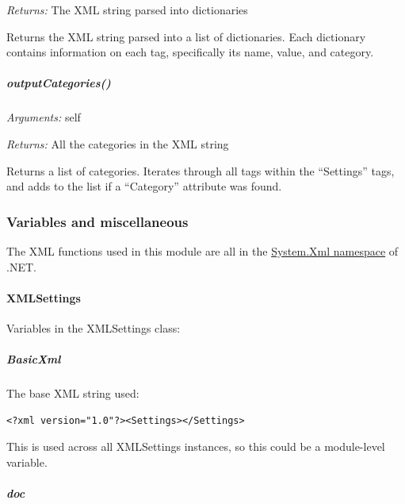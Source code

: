 \documentclass[12pt,letterpaper]{article}
\begin{document}
\emph{Returns:} The XML string parsed into dictionaries

Returns the XML string parsed into a list of dictionaries. Each dictionary contains information on each tag, specifically its name, value, and category.



%
%
\subparagraph{outputCategories()}
\label{4.4.1.0.7}

\emph{Arguments:} self

\emph{Returns:} All the categories in the XML string

Returns a list of categories. Iterates through all tags within the ``Settings'' tags, and adds to the list if a ``Category'' attribute was found.



%
%
\subsubsection{Variables and miscellaneous}
\label{4.4.2}

The XML functions used in this module are all in the \href{http://msdn.microsoft.com/en-us/library/y3y47afh.aspx}{System.Xml namespace} of .NET.

\setcounter{paragraph}{-1}



%
%
\paragraph{XMLSettings}
\label{4.4.2.0}

Variables in the XMLSettings class:

\setcounter{subparagraph}{-1}



%
%
\subparagraph{BasicXml}
\label{4.4.2.0.0}

The base XML string used:

\selectfont

\begin{lstlisting}
<?xml version="1.0"?><Settings></Settings>
\end{lstlisting}

\selectfont

This is used across all XMLSettings instances, so this could be a module-level variable.



%
%
\subparagraph{doc}
\label{4.4.2.0.1}
\end{document}
